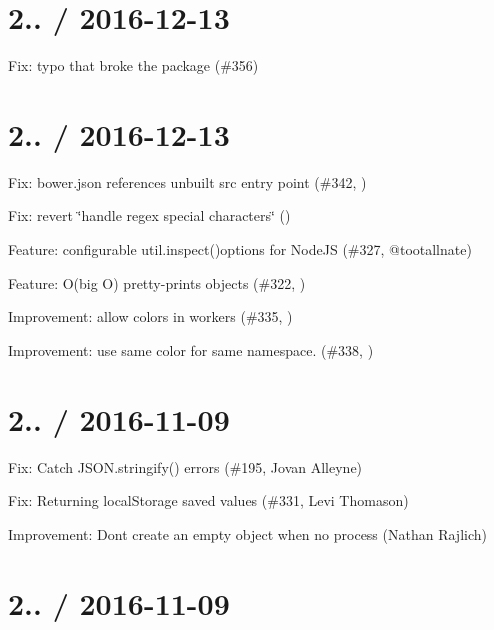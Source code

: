 \section*{2.. / 2016-\/12-\/13 }


\begin{DoxyItemize}
\item Fix\+: typo that broke the package (\#356)
\end{DoxyItemize}

\section*{2.. / 2016-\/12-\/13 }


\begin{DoxyItemize}
\item Fix\+: bower.\+json references unbuilt src entry point (\#342, )
\item Fix\+: revert \char`\"{}handle regex special characters\char`\"{} ()
\item Feature\+: configurable util.\+inspect(){\ttfamily options for Node\+JS (\#327, @tootallnate)}
\item {\ttfamily Feature\+: O}(big O) pretty-\/prints objects (\#322, )
\item Improvement\+: allow colors in workers (\#335, )
\item Improvement\+: use same color for same namespace. (\#338, )
\end{DoxyItemize}

\section*{2.. / 2016-\/11-\/09 }


\begin{DoxyItemize}
\item Fix\+: Catch {\ttfamily J\+S\+O\+N.\+stringify()} errors (\#195, Jovan Alleyne)
\item Fix\+: Returning {\ttfamily local\+Storage} saved values (\#331, Levi Thomason)
\item Improvement\+: Don\textquotesingle{}t create an empty object when no {\ttfamily process} (Nathan Rajlich)
\end{DoxyItemize}

\section*{2.. / 2016-\/11-\/09 }



